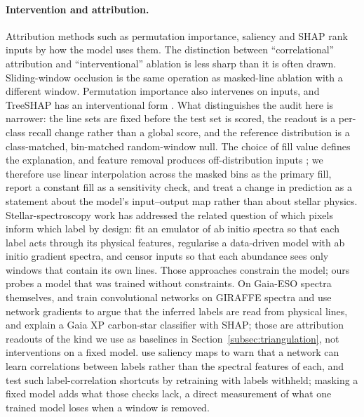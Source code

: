 \documentclass[11pt,a4paper]{article}
\begin{document}
\paragraph{Intervention and attribution.} Attribution methods such as permutation importance, saliency and SHAP rank inputs by how the model uses them. The distinction between ``correlational'' attribution and ``interventional'' ablation is less sharp than it is often drawn. Sliding-window occlusion is the same operation as masked-line ablation with a different window. Permutation importance also intervenes on inputs, and TreeSHAP has an interventional form \citep{Lundberg2020TreeSHAP,Janzing2020Causal}. What distinguishes the audit here is narrower: the line sets are fixed before the test set is scored, the readout is a per-class recall change rather than a global score, and the reference distribution is a class-matched, bin-matched random-window null. The choice of fill value defines the explanation, and feature removal produces off-distribution inputs \citep{Hooker2019Benchmark,Covert2021Removing}; we therefore use linear interpolation across the masked bins as the primary fill, report a constant fill as a sensitivity check, and treat a change in prediction as a statement about the model's input--output map rather than about stellar physics. Stellar-spectroscopy work has addressed the related question of which pixels inform which label by design: \citet{2019ApJ...879...69T} fit an emulator of ab initio spectra so that each label acts through its physical features, \citet{2019ApJS..245...34X} regularise a data-driven model with ab initio gradient spectra, and \citet{2019MNRAS.483.3255L} censor inputs so that each abundance sees only windows that contain its own lines. Those approaches constrain the model; ours probes a model that was trained without constraints. On Gaia-ESO spectra themselves, \citet{Ambrosch2023GESML} and \citet{Nepal2023GESML} train convolutional networks on GIRAFFE spectra and use network gradients to argue that the inferred labels are read from physical lines, and \citet{Ye2025CarbonSHAP} explain a Gaia XP carbon-star classifier with SHAP; those are attribution readouts of the kind we use as baselines in Section~\ref{subsec:triangulation}, not interventions on a fixed model. \citet{2024A&A...692A.228C} use saliency maps to warn that a network can learn correlations between labels rather than the spectral features of each, and \citet{Ambrosch2023GESML} test such label-correlation shortcuts by retraining with labels withheld; masking a fixed model adds what those checks lack, a direct measurement of what one trained model loses when a window is removed.
\end{document}
